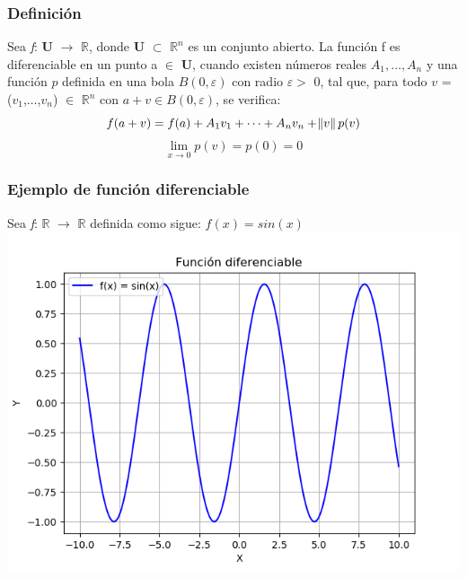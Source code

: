 \documentclass[12pt, letterpaper]{article}
\begin{document}
\subsubsection{Definici\'on}
Sea \cite{Cmat} \textit{f}: $\textbf{U}$ $\rightarrow$ $\mathbb{R}$, donde $\textbf{U}$ $\subset$ $\mathbb{R}^n$ es un conjunto abierto. La funci\'on f es diferenciable en un punto a $\in$ $\textbf{U}$, cuando existen n\'umeros reales $A_{1},\dots,A_{n}$ y una funci\'on $p$ definida en una bola $B(0, \varepsilon)$ con radio $\varepsilon >$  0, tal que, para todo $v$ = ($v_1$,$\dots$,$v_n$) $\in$  $\mathbb{R}^n$ con $a + v \in B(0,\varepsilon)$, se verifica:
\begin{equation}\label{eq:cond1diferenciable}
f(a+v) = f(a) + A_1 v_1 + \dots + A_n v_n +  \norm{v}p(v)
\end{equation}
\begin{equation}\label{eq:cond2diferenciable}
\lim_{x\to 0} p(v)= p(0)=0
\end{equation}

\subsubsection{Ejemplo de funci\'on diferenciable}
Sea \textit{f}: $\mathbb{R}$ $\rightarrow$ $\mathbb{R}$ definida como sigue: $f(x) = sin(x)$ \\
\includegraphics[scale=0.8]{diferenciable} \\
\end{document}
